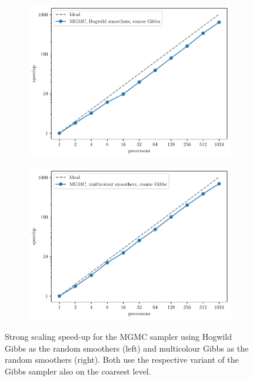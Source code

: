 \documentclass[
fontsize=11pt,
paper=a4,
numbers=noenddot
]{scrartcl}
\begin{document}
\begin{figure}[htbp]
    \centering
    \begin{subfigure}[b]{0.49\textwidth}
        \centering
        \includegraphics[width=\textwidth]{plots/strong_scaling_mgmc+hw+gibbs_4097x4097.pdf}
    \end{subfigure}
    \hfill
    \begin{subfigure}[b]{0.49\textwidth}
        \centering
        \includegraphics[width=\textwidth]{plots/strong_scaling_mgmc+mg+gibbs_4097x4097.pdf}
    \end{subfigure}
    \caption{Strong scaling speed-up for the MGMC sampler using Hogwild Gibbs as the random smoothers (left) and multicolour Gibbs as the random smoothers (right). Both use the respective variant of the Gibbs sampler also on the coarsest level.}
    \label{fig:2d_structured_mgmc_ss}
\end{figure}
\end{document}
